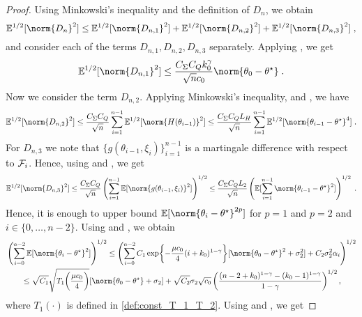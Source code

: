 \begin{proof}
Using Minkowski's inequality and the definition of $D_n$, we obtain 
\begin{equation}
    \PE^{1/2}[\norm{D_n}^2] \leq 
    \PE^{1/2}[\norm{D_{n,1}}^2] +\PE^{1/2}[\norm{D_{n,2}}^2] + \PE^{1/2}[\norm{D_{n,3}}^2]\eqsp,
\end{equation}
and consider each of the terms $D_{n,1}, D_{n,2}, D_{n,3}$ separately. Applying , we get
\begin{equation}
     \PE^{1/2}[\norm{D_{n,1}}^2] \leq \frac{C_{\Sigma}C_{Q}k_0^\gamma}{\sqrt{n}c_0}\norm{\theta_0-\thetas}\eqsp.
\end{equation}
Now we consider the term $D_{n,2}$. Applying Minkowski's inequality,  and , we have
\begin{equation}
    \PE^{1/2}[\norm{D_{n,2}}^2] \leq \frac{C_{\Sigma}C_{Q}}{\sqrt{n}}\sum_{i=1}^{n-1}\PE^{1/2}[\norm{H(\theta_{i-1})}^2]\leq \frac{C_{\Sigma}C_{Q}L_H}{\sqrt{n}}\sum_{i=1}^{n-1}\PE^{1/2}[\norm{\theta_{i-1}-\thetas}^4]\eqsp.
\end{equation}
For $D_{n,3}$ we note that $\{g(\theta_{i-1},\xi_i)\}_{i=1}^{n-1}$ is a  martingale difference with respect to $\mathcal{F}_i$. Hence, using   and , we get 
\begin{equation}
\PE^{1/2}[\norm{D_{n,3}}^2] \leq \frac{C_{\Sigma}C_{Q}}{\sqrt{n}}\left(\sum_{i=1}^{n-1}\PE[\norm{g(\theta_{i-1},\xi_i)}^2]\right)^{1/2}
\leq \frac{C_{\Sigma}C_{Q}L_2}{\sqrt{n}}\left(\PE[\sum_{i=1}^{n-1}\norm{\theta_{i-1}-\thetas}^2]\right)^{1/2}\eqsp.
\end{equation}
Hence, it is enough to upper bound $\PE[\norm{\theta_{i}-\thetas}^{2p}]$ for $p = 1$ and $p = 2$ and $i \in \{0,\ldots,n-2\}$. Using  and , we obtain 
\begin{align}
&\left(\sum_{i=0}^{n-2}\PE[\norm{\theta_{i}-\thetas}^2]\right)^{1/2} \leq \left(\sum_{i=0}^{n-2} C_1\exp\biggl\{ -\frac{\mu c_0}{4}(i+k_0)^{1-\gamma}\biggr\}[\norm{\theta_0-\thetas}^2 + \sigma_2^2] + C_2\sigma_2^2\alpha_i\right)^{1/2}\\
&\qquad  \leq \sqrt{C_1}\sqrt{T_1\biggl(\frac{\mu c_0}{4}\biggr)}[\norm{\theta_0-\thetas} + \sigma_2] + \sqrt{C_2}\sigma_2\sqrt{c_0}\left(\frac{(n-2+k_0)^{1-\gamma} -(k_0-1)^{1-\gamma}}{1-\gamma}\right)^{1/2}, 
\end{align}
where $T_1(\cdot)$ is defined in \eqref{def:const_T_1_T_2}. Using  and , we get 

\end{proof}
